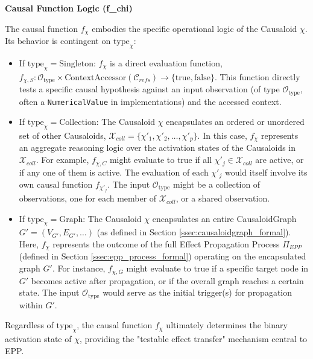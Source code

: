 \textbf{Causal Function Logic (f\_chi)}


The causal function \(f_\chi\) embodies the specific operational logic of the Causaloid \(\chi\). Its behavior is contingent on \(\text{type}_\chi\):

\begin{itemize}
    \item If \( \text{type}_\chi = \text{Singleton} \):
    \(f_\chi\) is a direct evaluation function, \(f_{\chi,S}: \mathcal{O}_{\text{type}} \times \text{ContextAccessor}(\mathcal{C}_{refs}) \to \{\text{true}, \text{false}\}\). This function directly tests a specific causal hypothesis against an input observation (of type \(\mathcal{O}_{\text{type}}\), often a \texttt{NumericalValue} in implementations) and the accessed context.

    \item If \( \text{type}_\chi = \text{Collection} \):
    The Causaloid \(\chi\) encapsulates an ordered or unordered set of other Causaloids, \(\mathcal{X}_{coll} = \{\chi'_1, \chi'_2, \dots, \chi'_p\}\).
    In this case, \(f_\chi\) represents an aggregate reasoning logic over the activation states of the Causaloids in \(\mathcal{X}_{coll}\). For example, \(f_{\chi,C}\) might evaluate to true if all \(\chi'_j \in \mathcal{X}_{coll}\) are active, or if any one of them is active. The evaluation of each \(\chi'_j\) would itself involve its own causal function \(f_{\chi'_j}\). The input \(\mathcal{O}_{\text{type}}\) might be a collection of observations, one for each member of \(\mathcal{X}_{coll}\), or a shared observation.

    \item If \( \text{type}_\chi = \text{Graph} \):
    The Causaloid \(\chi\) encapsulates an entire CausaloidGraph \(G'=(V_{G'}, E_{G'}, \dots)\) (as defined in Section \ref{ssec:causaloidgraph_formal}).
    Here, \(f_\chi\) represents the outcome of the full Effect Propagation Process \(\Pi_{EPP}\) (defined in Section \ref{ssec:epp_process_formal}) operating on the encapsulated graph \(G'\). For instance, \(f_{\chi,G}\) might evaluate to true if a specific target node in \(G'\) becomes active after propagation, or if the overall graph reaches a certain state. The input \(\mathcal{O}_{\text{type}}\) would serve as the initial trigger(s) for propagation within \(G'\).
\end{itemize}
Regardless of \(\text{type}_\chi\), the causal function \(f_\chi\) ultimately determines the binary activation state of \(\chi\), providing the "testable effect transfer" mechanism central to EPP.

